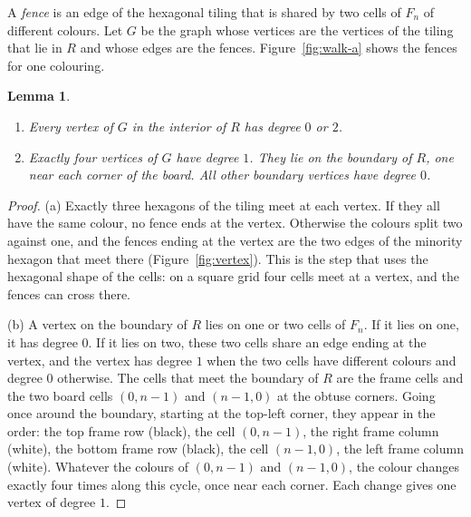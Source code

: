 \documentclass[11pt,a4paper]{amsart}
\newtheorem{lemma}[theorem]{Lemma}
\theoremstyle{definition}
\theoremstyle{remark}
\begin{document}
A \emph{fence} is an edge of the hexagonal tiling that is shared by two cells of $F_n$ of different colours. Let $G$ be the graph whose vertices are the vertices of the tiling that lie in $R$ and whose edges are the fences. Figure~\ref{fig:walk-a} shows the fences for one colouring.

\begin{lemma}\label{lem:degrees}
\begin{enumerate}
  \item[(a)] Every vertex of $G$ in the interior of $R$ has degree $0$ or $2$.
  \item[(b)] Exactly four vertices of $G$ have degree $1$. They lie on the boundary of $R$, one near each corner of the board. All other boundary vertices have degree $0$.
\end{enumerate}
\end{lemma}

\begin{proof}
(a) Exactly three hexagons of the tiling meet at each vertex. If they all have the same colour, no fence ends at the vertex. Otherwise the colours split two against one, and the fences ending at the vertex are the two edges of the minority hexagon that meet there (Figure~\ref{fig:vertex}). This is the step that uses the hexagonal shape of the cells: on a square grid four cells meet at a vertex, and the fences can cross there.

(b) A vertex on the boundary of $R$ lies on one or two cells of $F_n$. If it lies on one, it has degree $0$. If it lies on two, these two cells share an edge ending at the vertex, and the vertex has degree $1$ when the two cells have different colours and degree $0$ otherwise. The cells that meet the boundary of $R$ are the frame cells and the two board cells $(0,n-1)$ and $(n-1,0)$ at the obtuse corners. Going once around the boundary, starting at the top-left corner, they appear in the order: the top frame row (black), the cell $(0,n-1)$, the right frame column (white), the bottom frame row (black), the cell $(n-1,0)$, the left frame column (white). Whatever the colours of $(0,n-1)$ and $(n-1,0)$, the colour changes exactly four times along this cycle, once near each corner. Each change gives one vertex of degree $1$.
\end{proof}
\end{document}
